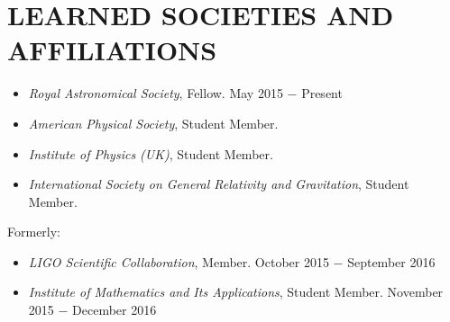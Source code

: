 \section{\textbf{\color{RoyalBlue}LEARNED SOCIETIES AND AFFILIATIONS}}

\begin{itemize}
\item {\sl Royal Astronomical Society}, Fellow. \hfill May 2015 $-$ Present \\
\item {\sl American Physical Society}, Student Member. \hfill \\
\item {\sl Institute of Physics (UK)}, Student Member. \hfill  \\
\item {\sl International Society on General Relativity and Gravitation}, Student Member. \hfill \\
\end{itemize}
Formerly: \\
\begin{itemize}
\item {\sl LIGO Scientific Collaboration}, Member. \hfill October 2015 $-$ September 2016 \\
\item {\sl Institute of Mathematics and Its Applications}, Student Member. \hfill November 2015 $-$ December 2016\\
\end{itemize}